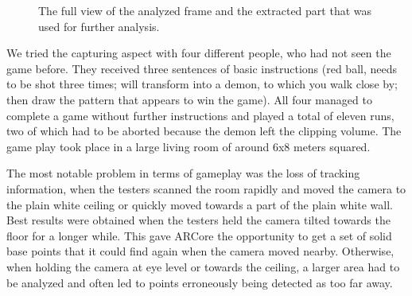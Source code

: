 \begin{figure}%
    \centering
    \qquad
    \caption{The full view of the analyzed frame and the extracted part that was used for further analysis.}%
    \label{fig:example-frame}%
\end{figure}

We tried the capturing aspect with four different people, who had not seen the game before. They received three sentences of basic instructions (red ball, needs to be shot three times; will transform into a demon, to which you walk close by; then draw the pattern that appears to win the game). All four managed to complete a game without further instructions and played a total of eleven runs, two of which had to be aborted because the demon left the clipping volume. The game play took place in a large living room of around 6x8 meters squared.

The most notable problem in terms of gameplay was the loss of tracking information, when the testers scanned the room rapidly and moved the camera to the plain white ceiling or quickly moved towards a part of the plain white wall. Best results were obtained when the testers held the camera tilted towards the floor for a longer while. This gave ARCore the opportunity to get a set of solid base points that it could find again when the camera moved nearby. Otherwise, when holding the camera at eye level or towards the ceiling, a larger area had to be analyzed and often led to points erroneously being detected as too far away.

